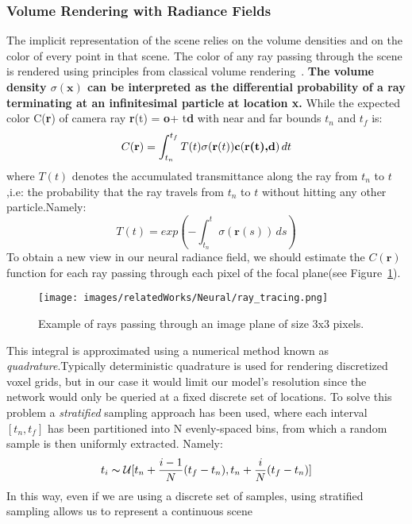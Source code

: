 \subsubsection{Volume Rendering with Radiance Fields}
The implicit representation of the scene relies on the volume densities and on the color
of every point in that scene. The color of any ray passing through the scene is rendered using
principles from classical volume rendering~\cite{nerf16}. \textbf{The volume density $\sigma(\textbf{x})$
can be interpreted as the differential probability of a ray terminating at an infinitesimal
particle at location \textbf{x}.} While the expected color C(\textbf{r}) of camera ray 
\textbf{r}(t) = \textbf{o}+ t\textbf{d} with near and far bounds $t_n$ and $t_f$ is:
\begin{equation}
    C(\textbf{r}) = \int_{t_n}^{t_f} T(t)\sigma(\textbf{r}(t))\textbf{c}(\textbf{\textbf{r}(t),\textbf{d}}) \,dt 
\end{equation} 
where $T(t)$ denotes the accumulated transmittance along the ray from $t_n$ to $t$,i.e:
the probability that the ray travels from $t_n$ to $t$ without hitting any other particle.Namely:
\begin{equation}
    T(t) = exp(-\int_{t_n}^{t}\sigma(\textbf{r}(s))\,ds)
\end{equation}
To obtain a new view in our neural radiance field, we should estimate the $C(\textbf{r})$
function for each ray passing through each pixel of the focal plane(see Figure~\ref{fig:rt}).
\begin{figure}
    \centering
    \texttt{[image: images/relatedWorks/Neural/ray\_tracing.png]} 
    \caption{Example of rays passing through an image plane of size 3x3 pixels.}\label{fig:rt}
\end{figure}
This integral is approximated using a numerical method known as \textit{quadrature}.Typically deterministic 
quadrature is used for rendering discretized voxel grids, but in our case it would limit our model's resolution
since the network would only be queried at a fixed discrete set of locations. To solve this problem a
\textit{stratified} sampling approach has been used, where each interval $[t_n,t_f]$ has been partitioned
into N evenly-spaced bins, from which a random sample is then uniformly extracted. Namely:
\begin{equation}
    t_i  \thicksim \mathcal{U} [t_n + \frac{i-1}{N}(t_f-t_n), t_n + \frac{i}{N}(t_f-t_n)]
\end{equation}
In this way, even if we are using a discrete set of samples, using stratified sampling allows us to represent a continuous scene 
